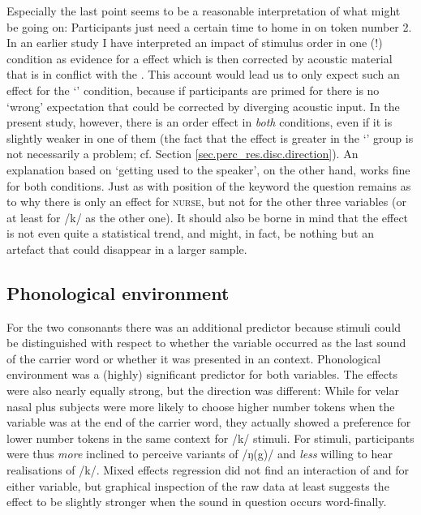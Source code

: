 Especially the last point seems to be a reasonable interpretation of what might be going on: Participants just need a certain time to home in on token number 2.
In an earlier study I have interpreted an impact of stimulus order in one (!) condition as evidence for a  effect which is then corrected by acoustic material that is in conflict with the  \parencite{juskanma}.
This account would lead us to only expect such an effect for the `' condition, because if participants are primed for  there is no `wrong' expectation that could be corrected by diverging acoustic input.
In the present study, however, there is an order effect in \emph{both} conditions, even if it is slightly weaker in one of them (the fact that the effect is greater in the `' group is not necessarily a problem; cf. Section \ref{sec.perc_res.disc.direction}).
An explanation based on `getting used to the speaker', on the other hand, works fine for both conditions.
Just as with position of the keyword the question remains as to why there is only an effect for \textsc{nurse}, but not for the other three variables (or at least for /k/ as the other  one).
It should also be borne in mind that the effect is not even quite a statistical trend, and might, in fact, be nothing but an artefact that could disappear in a larger sample.

		\subsection{Phonological environment}

For the two consonants there was an additional predictor because stimuli could be distinguished with respect to whether the variable occurred as the last sound of the carrier word or whether it was presented in an  context.
Phonological environment was a (highly) significant predictor for both  variables.
The effects were also nearly equally strong, but the direction was different: While for velar nasal plus subjects were more likely to choose higher number tokens when the variable was at the end of the carrier word, they actually showed a preference for lower number tokens in the same context for /k/ stimuli.
For  stimuli, participants were thus \emph{more} inclined to perceive  variants of /ŋ(g)/ and \emph{less} willing to hear  realisations of /k/.
Mixed effects regression did not find an interaction of  and  for either variable, but graphical inspection of the raw data at least suggests the  effect to be slightly stronger when the sound in question occurs word-finally.

